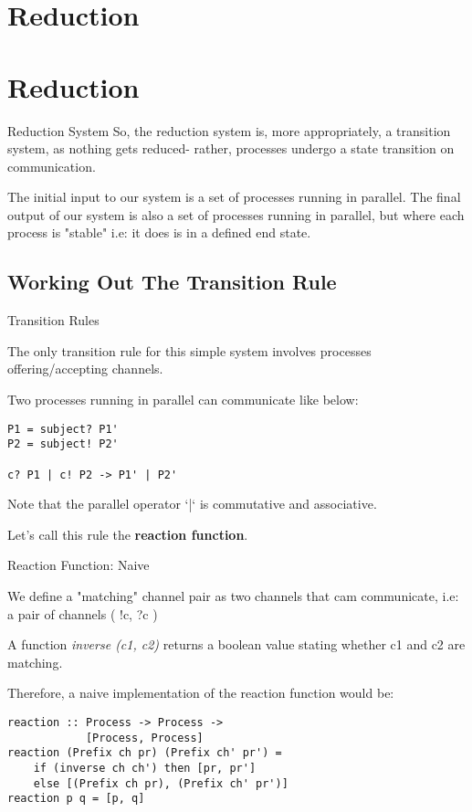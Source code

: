 \documentclass{beamer}
\begin{document}
\section{Reduction}

\section{Reduction}

\begin{frame}{Reduction System}
So, the reduction system is, more appropriately, a transition system, as nothing gets reduced- rather, processes undergo a state transition on communication.

The initial input to our system is a set of processes running in parallel. The final output of our system is also a set of processes running in parallel, but where each process is "stable" i.e: it does is in a defined end state.
\end{frame}

\subsection{Working Out The Transition Rule}

\begin{frame}[fragile]{Transition Rules}

The only transition rule for this simple system involves processes offering/accepting channels.

Two processes running in parallel can communicate like below:

\begin{lstlisting}
P1 = subject? P1'
P2 = subject! P2'

c? P1 | c! P2 -> P1' | P2'
\end{lstlisting}

Note that the parallel operator `|` is commutative and associative.

Let's call this rule the \textbf{reaction function}.
\end{frame}

\begin{frame}[fragile]{Reaction Function: Naive}

We define a "matching" channel pair as two channels that cam communicate, i.e: a pair of channels ( !c, ?c )

A function \textit{inverse (c1, c2)} returns a boolean value stating whether c1 and c2 are matching. 

Therefore, a naive implementation of the reaction function would be:

\begin{lstlisting}
reaction :: Process -> Process -> 
            [Process, Process]
reaction (Prefix ch pr) (Prefix ch' pr') = 
	if (inverse ch ch') then [pr, pr'] 
	else [(Prefix ch pr), (Prefix ch' pr')] 
reaction p q = [p, q]
\end{lstlisting}

\end{frame}
\end{document}
